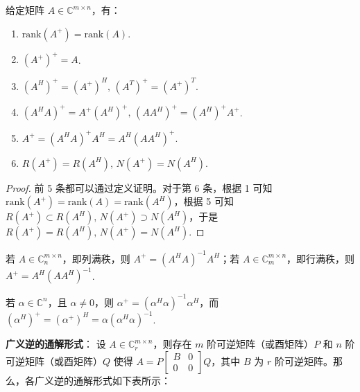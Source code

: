\begin{theorem}
给定矩阵 $A\in\mathbb C^{m\times n}$，有：
\begin{enumerate}
    \item $\text{rank}(A^+)=\text{rank}(A)$.
    \item $(A^+)^+=A$.
    \item $(A^H)^+=(A^+)^H,\,(A^T)^+=(A^+)^T$.
    \item $(A^HA)^+=A^+(A^H)^+,\,(AA^H)^+=(A^H)^+A^+$.
    \item $A^+=(A^HA)^+A^H=A^H(AA^H)^+$.
    \item $R(A^+)=R(A^H),\,N(A^+)=N(A^H)$.
\end{enumerate}
\end{theorem}
\begin{proof}
前 5 条都可以通过定义证明。对于第 6 条，根据 1 可知 $\text{rank}(A^+)=\text{rank}(A)=\text{rank}(A^H)$，根据 5 可知 $R(A^+)\subset R(A^H),\,N(A^+)\supset N(A^H)$，于是 $R(A^+)=R(A^H),\,N(A^+)=N(A^H)$.
\end{proof}

\begin{corollary}
若 $A\in\mathbb C_n^{m\times n}$，即列满秩，则 $A^+=(A^HA)^{-1}A^H$；若 $A\in\mathbb C_m^{m\times n}$，即行满秩，则 $A^+=A^H(AA^H)^{-1}$.
\end{corollary}

\begin{corollary}
若 $\alpha\in\mathbb C^n$，且 $\alpha\neq 0$，则 $\alpha^+=(\alpha^H\alpha)^{-1}\alpha^H$，而 $(\alpha^H)^+=(\alpha^+)^H=\alpha(\alpha^H\alpha)^{-1}$.
\end{corollary}

\vskip 6pt \noindent\textbf{广义逆的通解形式}：
设 $A\in\mathbb C^{m\times n}_r$，则存在 $m$ 阶可逆矩阵（或酉矩阵）$P$ 和 $n$ 阶可逆矩阵（或酉矩阵）$Q$ 使得 $A=P\begin{bmatrix}B&0\\0&0\end{bmatrix}Q$，其中 $B$ 为 $r$ 阶可逆矩阵。那么，各广义逆的通解形式如下表所示：

